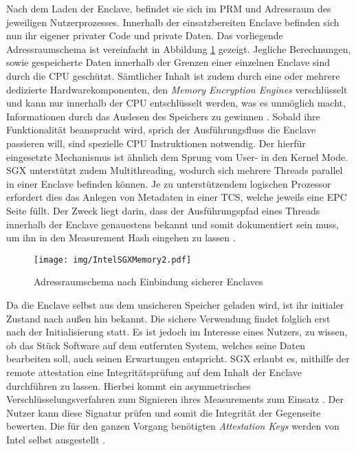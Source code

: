Nach dem Laden der Enclave, befindet sie sich im \ac{PRM} und Adressraum des jeweiligen Nutzerprozesses. Innerhalb der einsatzbereiten Enclave befinden sich nun ihr eigener privater Code und private Daten. Das vorliegende Adressraumschema ist vereinfacht in Abbildung \ref{fig:intelsgxmemory2} gezeigt. Jegliche Berechnungen, sowie gespeicherte Daten innerhalb der Grenzen einer einzelnen Enclave sind durch die \ac{CPU} geschützt. Sämtlicher Inhalt ist zudem durch eine oder mehrere dedizierte Hardwarekomponenten, den \textit{Memory Encryption Engines} verschlüsselt und kann nur innerhalb der \ac{CPU} entschlüsselt werden, was es unmöglich macht, Informationen durch das Auslesen des Speichers zu gewinnen \cite{McKeen2013}. Sobald ihre Funktionalität beansprucht wird, sprich der Ausführungsfluss die Enclave passieren will, sind spezielle \ac{CPU} Instruktionen notwendig. Der hierfür eingesetzte Mechanismus ist ähnlich dem Sprung vom User- in den Kernel Mode. \ac{SGX} unterstützt zudem Multithreading, wodurch sich mehrere Threads parallel in einer Enclave befinden können. Je zu unterstützendem logischen Prozessor erfordert dies das Anlegen von Metadaten in einer \ac{TCS}, welche jeweils eine \ac{EPC} Seite füllt. Der Zweck liegt darin, dass der Ausführungspfad eines Threads innerhalb der Enclave genauestens bekannt und somit dokumentiert sein muss, um ihn in den Measurement Hash eingehen zu lassen \cite{McKeen2013}.

\begin{figure}
	\texttt{[image: img/IntelSGXMemory2.pdf]}
	\centering
	\caption{Adressraumschema nach Einbindung sicherer Enclaves}
	\label{fig:intelsgxmemory2}
\end{figure}

Da die Enclave selbst aus dem unsicheren Speicher geladen wird, ist ihr initialer Zustand nach außen hin bekannt. Die sichere Verwendung findet folglich erst nach der Initialisierung statt. Es ist jedoch im Interesse eines Nutzers, zu wissen, ob das Stück Software auf dem entfernten System, welches seine Daten bearbeiten soll, auch seinen Erwartungen entspricht. \ac{SGX} erlaubt es, mithilfe der remote attestation eine Integritätsprüfung auf dem Inhalt der Enclave durchführen zu lassen. Hierbei kommt ein asymmetrisches Verschlüsselungsverfahren zum Signieren ihres Measurements zum Einsatz \cite{Costan2016}. Der Nutzer kann diese Signatur prüfen und somit die Integrität der Gegenseite bewerten. Die für den ganzen Vorgang benötigten \textit{Attestation Keys} werden von Intel selbst ausgestellt \cite{Johnson2016}.

